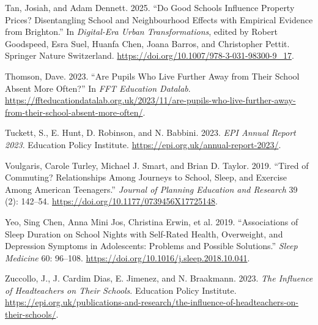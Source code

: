 \documentclass[
  12pt,
  titlepage]{article}
\newlength{\cslhangindent}
\newenvironment{CSLReferences}[2] %
 {\begin{list}{}{%
  \setlength{\itemindent}{0pt}
  \setlength{\leftmargin}{0pt}
  \setlength{\parsep}{0pt}
  \ifodd #1
   \setlength{\leftmargin}{\cslhangindent}
   \setlength{\itemindent}{-1\cslhangindent}
  \fi
  \setlength{\itemsep}{#2\baselineskip}}}
 {\end{list}}
\begin{document}
\begin{CSLReferences}{1}{1}
Tan, Josiah, and Adam Dennett. 2025. {``Do {Good} {Schools} {Influence}
{Property} {Prices}? {Disentangling} {School} and {Neighbourhood}
{Effects} with {Empirical} {Evidence} from {Brighton}.''} In
\emph{Digital-{Era} {Urban} {Transformations}}, edited by Robert
Goodspeed, Esra Suel, Huanfa Chen, Joana Barros, and Christopher Pettit.
Springer Nature Switzerland.
\url{https://doi.org/10.1007/978-3-031-98300-9_17}.

Thomson, Dave. 2023. {``Are Pupils Who Live Further Away from Their
School Absent More Often?''} In \emph{FFT Education Datalab}.
\url{https://ffteducationdatalab.org.uk/2023/11/are-pupils-who-live-further-away-from-their-school-absent-more-often/}.

Tuckett, S., E. Hunt, D. Robinson, and N. Babbini. 2023. \emph{{EPI}
{Annual} {Report} 2023}. Education Policy Institute.
\url{https://epi.org.uk/annual-report-2023/}.

Voulgaris, Carole Turley, Michael J. Smart, and Brian D. Taylor. 2019.
{``Tired of Commuting? {Relationships} Among Journeys to School, Sleep,
and Exercise Among {American} Teenagers.''} \emph{Journal of Planning
Education and Research} 39 (2): 142--54.
\url{https://doi.org/10.1177/0739456X17725148}.

Yeo, Sing Chen, Anna Mini Jos, Christina Erwin, et al. 2019.
{``Associations of Sleep Duration on School Nights with Self-Rated
Health, Overweight, and Depression Symptoms in Adolescents: Problems and
Possible Solutions.''} \emph{Sleep Medicine} 60: 96--108.
\url{https://doi.org/10.1016/j.sleep.2018.10.041}.

Zuccollo, J., J. Cardim Dias, E. Jimenez, and N. Braakmann. 2023.
\emph{The Influence of Headteachers on Their Schools}. Education Policy
Institute.
\url{https://epi.org.uk/publications-and-research/the-influence-of-headteachers-on-their-schools/}.

\end{CSLReferences}
\end{document}
